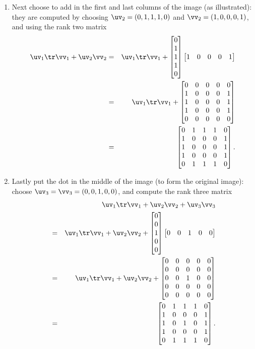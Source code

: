 \begin{example}
\begin{solution}
\begin{enumerate}
\item Next choose to add in the first and last columns of the image (as illustrated): they are computed by choosing  \(\uv_2=(0,1,1,1,0)\) and \(\vv_2=(1,0,0,0,1)\), and using the rank two matrix
\marginpar{}
\begin{eqnarray*}
\uv_1\tr\vv_1+\uv_2\vv_2
&=&\uv_1\tr\vv_1+\begin{bmatrix} 0\\1\\1\\1\\0 \end{bmatrix}
\begin{bmatrix} 1&0&0&0&1 \end{bmatrix}
\\&=&\uv_1\tr\vv_1+\begin{bmatrix} 0&0&0&0&0
\\1&0&0&0&1
\\1&0&0&0&1
\\1&0&0&0&1
\\0&0&0&0&0 \end{bmatrix}
\\&=&\begin{bmatrix} 0&1&1&1&0
\\1&0&0&0&1
\\1&0&0&0&1
\\1&0&0&0&1
\\0&1&1&1&0 \end{bmatrix}.
\end{eqnarray*}

\item Lastly put the dot in the middle of the image (to form the original image): choose  \(\uv_3=\vv_3=(0,0,1,0,0)\), and compute the rank three matrix
\begin{eqnarray*}
&&\uv_1\tr\vv_1+\uv_2\vv_2+\uv_3\vv_3
\\&=&\uv_1\tr\vv_1+\uv_2\vv_2
+\begin{bmatrix} 0\\0\\1\\0\\0 \end{bmatrix}
\begin{bmatrix} 0&0&1&0&0 \end{bmatrix}
\\&=&\uv_1\tr\vv_1+\uv_2\vv_2+\begin{bmatrix} 0&0&0&0&0
\\0&0&0&0&0
\\0&0&1&0&0
\\0&0&0&0&0
\\0&0&0&0&0 \end{bmatrix}
\\&=&\begin{bmatrix} 0&1&1&1&0
\\1&0&0&0&1
\\1&0&1&0&1
\\1&0&0&0&1
\\0&1&1&1&0 \end{bmatrix}.
\end{eqnarray*}


\end{enumerate}
\end{solution}
\end{example}
